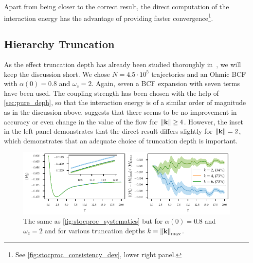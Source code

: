 Apart from being closer to the correct result, the direct computation
of the interaction energy has the advantage of providing faster
convergence\footnote{See \cref{fig:stocproc_consistency_dev}, lower right
  panel.}.

\subsection{Hierarchy Truncation}
\label{sec:trunc}
As the effect truncation depth has already been studied thoroughly
in~\cite{RichardDiss}, we will keep the discussion short.  We chose
\(N=4.5 \cdot 10^5\) trajectories and an Ohmic BCF with \(α(0)=0.8\)
and \(ω_c=2\). Again, seven a BCF expansion with seven terms have been
used. The coupling strength has been chosen with the help of
\cref{sec:pure_deph}, so that the interaction energy is of a similar
order of magnitude as in the discussion
above.  suggests that there seems to be no
improvement in accuracy or even change in the value of the flow for
\(\norm{\vb{k}}\geq 4\). However, the inset in the left panel
demonstrates that the direct result differs slightly for
\(\norm{\vb{k}} = 2\), which demonstrates that an adequate choice of
truncation depth is important.
\begin{figure}[hp]
  \centering
  \includegraphics{figs/one_bath_syst/k_systematics_interaction}
  \caption{\label{fig:k_systematics} The same as
    \cref{fig:stocproc_systematics} but for \(α(0)=0.8\) and
    \(ω_c=2\) and for various truncation depths \(k=\norm{\vb{k}}_{\mathrm{max}}\).}
\end{figure}


